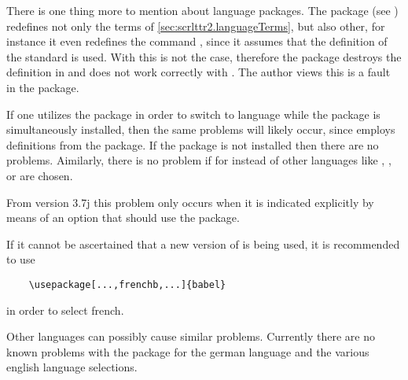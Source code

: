 \begin{Explain}
  There is one thing more to mention about language packages.  The
  package  (see
  \cite{package:french}) redefines not only the terms of
  \autoref{sec:scrlttr2.languageTerms}, but also other, for instance
  it even redefines the command , since it assumes that
  the definition of the standard  is used.  With
   this is not the case, therefore the package
   destroys the definition in  and
  does not work correctly with \KOMAScript. The author views this is a
  fault in the  package.

  If one utilizes the  package in
  order to switch to language  while the package
   is simultaneously installed,
  then the same problems will likely occur, since 
  employs definitions from the  package. If the
  package  is not installed then there are no
  problems. Aimilarly, there is no problem if for 
  instead of  other languages like ,
  ,  or  are chosen.

  From  version 3.7j this problem only occurs when it
  is indicated explicitly by means of an option that 
  should use the  package.

  If it cannot be ascertained that a new version of  is
  being used, it is recommended to use


  \begin{lstlisting}
    \usepackage[...,frenchb,...]{babel}
  \end{lstlisting}

  in order to select french.

  Other languages can possibly cause similar problems. Currently there
  are no known problems with the  package for the
  german language and the various english language selections.


\end{Explain}
 
